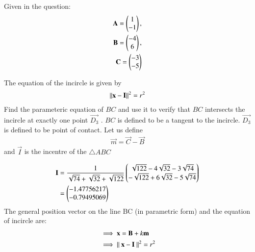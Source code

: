 \documentclass[journal,12pt,twocolumn]{IEEEtran}
\theoremstyle{remark}
\begin{document}


Given in the question:
  \begin{align}
    \mathbf{A} = \begin{pmatrix}1\\-1\end{pmatrix}  ,\\
    \mathbf{B} = \begin{pmatrix}-4\\6\end{pmatrix} ,\\
    \mathbf{C} = \begin{pmatrix}-3\\-5\end{pmatrix}
    \end{align}

The equation of the incircle is given by
\begin{align}
\left\lVert\mathbf{x}-\mathbf{I}\right\rVert^2 = r^2
\end{align}
Find the parameteric equation of $BC$ and use it to verify that $BC$
intersects the incircle at exactly one point $\vec{D_{3}}$ . $BC$ is defined to be a
tangent to the incircle. $\vec{D_{3}}$ is defined to be point of contact. 
\solution
Let us define 
\begin{align}
\vec{m} = \vec{C}-\vec{B} 
\end{align}
and $\vec{I}$ is the incentre of the $\triangle ABC$

\begin{align}
\mathbf{I} &= \frac{1}{\sqrt{74}+\sqrt{32}+\sqrt{122}}\begin{pmatrix}{\sqrt{122}-4\sqrt{32}-3\sqrt{74}}\\{-\sqrt{122}+6\sqrt{32}-5\sqrt{74}}\end{pmatrix}\\
&=\begin{pmatrix}-1.47756217 \\-0.79495069\end{pmatrix}
\end{align}
The general position vector on the line BC (in parametric form)  and the equation of incircle are:
\begin{align}
 &\implies \mathbf{x} = \mathbf{B} + k{\mathbf{m}}\label{eq:8}\\
 &\implies \left\lVert\ \mathbf{x} - \mathbf{I}\ \right\rVert^2 = r^2 \label{eq:9}
\end{align}
\end{document}
